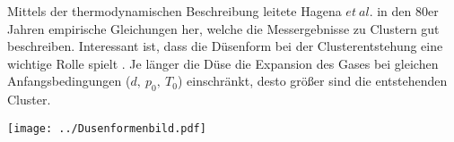 Mittels der thermodynamischen Beschreibung leitete Hagena $et\ al.$ in den 80er Jahren empirische Gleichungen her, welche die Messergebnisse zu Clustern gut beschreiben. Interessant ist, dass die Düsenform bei der Clusterentstehung eine wichtige Rolle spielt \cite{hagena1972duseform}. Je länger die Düse die Expansion des Gases bei gleichen Anfangsbedingungen ($d,\ p_0, \ T_0$) einschränkt, desto größer sind die entstehenden Cluster. 

\begin{center}
\begin{minipage}{\linewidth}
\centering
\texttt{[image: ../Dusenformenbild.pdf]}%
 \label{fig:Formen}
\end{minipage} 
\end{center}

